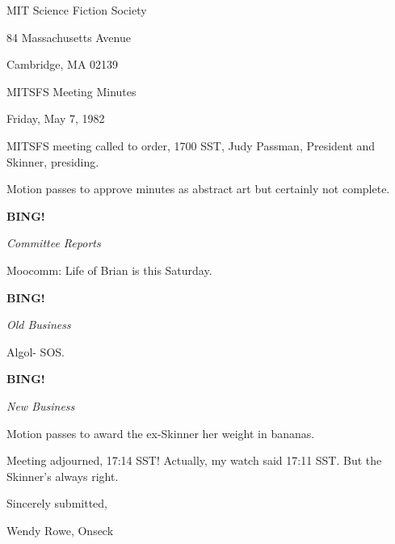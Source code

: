 \documentclass[12pt]{article}
\newcommand{\bing}{{\bf BING!} }
\newcommand{\goto}[1]{\bing \vskip 12pt \centerline{{\em{#1}}}}
\begin{document}
\begin{center}

MIT Science Fiction Society 

84 Massachusetts Avenue

Cambridge, MA 02139

\vspace{12pt}

MITSFS Meeting Minutes 

Friday, May 7, 1982

\end{center}
 
\vspace{18pt}

\setlength{\parskip}{6pt}

\noindent
MITSFS meeting called to order, 1700 SST,
Judy Passman, President and Skinner, presiding.

Motion passes to approve minutes as abstract art but certainly not complete.

\goto{Committee Reports}

Moocomm: Life of Brian is this Saturday.

\goto{Old Business}

Algol- SOS.

\goto{New Business}

Motion passes to award the ex-Skinner her weight in bananas.

\vspace{12pt}

\noindent
Meeting adjourned, 17:14 SST! Actually, my watch said 17:11 SST. But the Skinner's always right.

\vspace{18pt}

\centerline{Sincerely submitted,}
\centerline{Wendy Rowe, Onseck}
\end{document}
